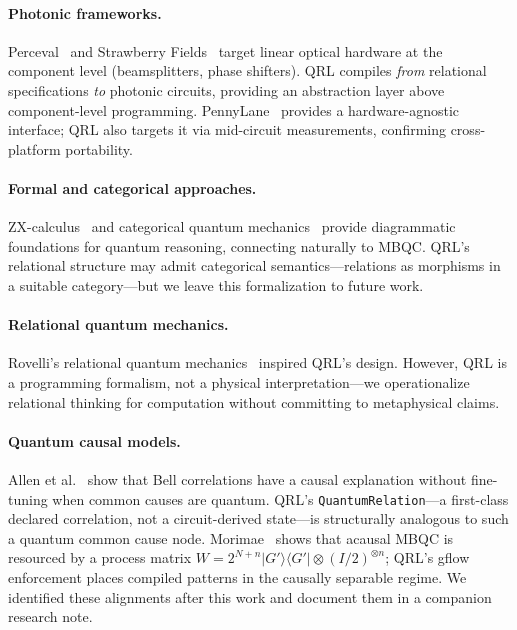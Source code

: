 \documentclass[submission,copyright,creativecommons]{eptcs}
\newcommand{\qrl}{\textsc{QRL}}
\newcommand{\mbqc}{\textsc{MBQC}}
\begin{document}
\paragraph{Photonic frameworks.}
Perceval~\cite{perceval} and Strawberry Fields~\cite{strawberryfields} target
linear optical hardware at the component level (beamsplitters, phase shifters).
\qrl{} compiles \emph{from} relational specifications \emph{to} photonic
circuits, providing an abstraction layer above component-level programming.
PennyLane~\cite{pennylane} provides a hardware-agnostic interface;
\qrl{} also targets it via mid-circuit measurements, confirming
cross-platform portability.

\paragraph{Formal and categorical approaches.}
ZX-calculus~\cite{zxcalculus} and categorical quantum
mechanics~\cite{coecke2017} provide diagrammatic foundations for
quantum reasoning, connecting naturally to \mbqc{}. \qrl{}'s
relational structure may admit categorical semantics---relations
as morphisms in a suitable category---but we leave this
formalization to future work.

\paragraph{Relational quantum mechanics.}
Rovelli's relational quantum mechanics~\cite{rovelli1996} inspired
\qrl{}'s design. However, \qrl{} is a programming formalism, not a
physical interpretation---we operationalize relational thinking for
computation without committing to metaphysical claims.

\paragraph{Quantum causal models.}
Allen et al.~\cite{allen2017} show that Bell correlations have a causal
explanation without fine-tuning when common causes are quantum.
\qrl{}'s \texttt{QuantumRelation}---a first-class declared correlation,
not a circuit-derived state---is structurally analogous to such a quantum
common cause node. Morimae~\cite{morimae2014} shows that acausal \mbqc{} is resourced
by a process matrix $W \!=\! 2^{N+n}|G'\rangle\langle G'|\otimes(I/2)^{\otimes n}$;
\qrl{}'s gflow enforcement places compiled patterns in the causally
separable regime. We identified these
alignments after this work and document them in a companion research note.
\end{document}
